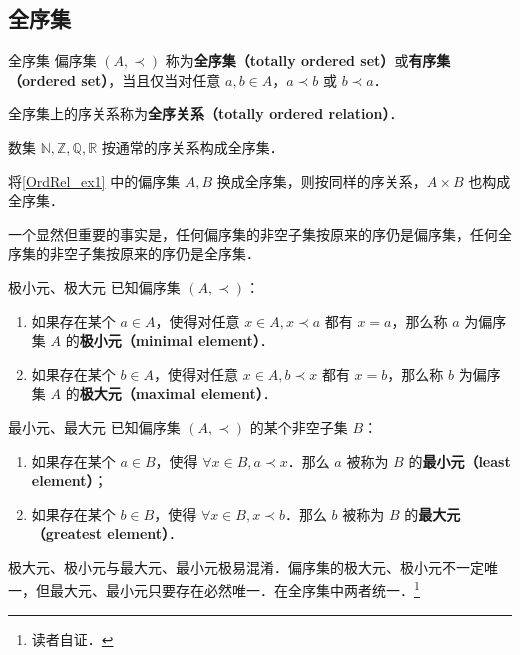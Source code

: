 \subsection{全序集}

\begin{definition}{全序集}
偏序集 $(A,\prec)$ 称为\textbf{全序集（totally ordered set）}或\textbf{有序集（ordered set）}，当且仅当对任意 $a,b \in A$，$a \prec b$ 或 $b \prec a$．
\end{definition}
全序集上的序关系称为\textbf{全序关系（totally ordered relation）}．
\begin{example}{}
数集 $\mathbb{N},\mathbb{Z},\mathbb{Q},\mathbb{R}$ 按通常的序关系构成全序集．
\end{example}
\begin{example}{}
将\autoref{OrdRel_ex1} 中的偏序集 $A,B$ 换成全序集，则按同样的序关系，$A\times B$ 也构成全序集．
\end{example}

一个显然但重要的事实是，任何偏序集的非空子集按原来的序仍是偏序集，任何全序集的非空子集按原来的序仍是全序集．

\begin{definition}{极小元、极大元}
已知偏序集 $(A,\prec)$：
\begin{enumerate}
\item 如果存在某个 $a \in A$，使得对任意 $x \in A, x\prec a$ 都有 $x = a$，那么称 $a$ 为偏序集 $A$ 的\textbf{极小元（minimal element）}．
\item 如果存在某个 $b \in A$，使得对任意 $x \in A, b\prec x$ 都有 $x = b$，那么称 $b$ 为偏序集 $A$ 的\textbf{极大元（maximal element）}．
\end{enumerate}
\end{definition}

\begin{definition}{最小元、最大元}
已知偏序集 $(A,\prec)$ 的某个非空子集 $B$：
\begin{enumerate}
\item 如果存在某个 $a \in B$，使得 $\forall x \in B, a \prec x$．那么 $a$ 被称为 $B$ 的\textbf{最小元（least element）}；
\item 如果存在某个 $b \in B$，使得 $\forall x \in B, x \prec b$．那么 $b$ 被称为 $B$ 的\textbf{最大元（greatest element）}．
\end{enumerate}
\end{definition}

极大元、极小元与最大元、最小元极易混淆．偏序集的极大元、极小元不一定唯一，但最大元、最小元只要存在必然唯一．在全序集中两者统一．\footnote{读者自证．}

